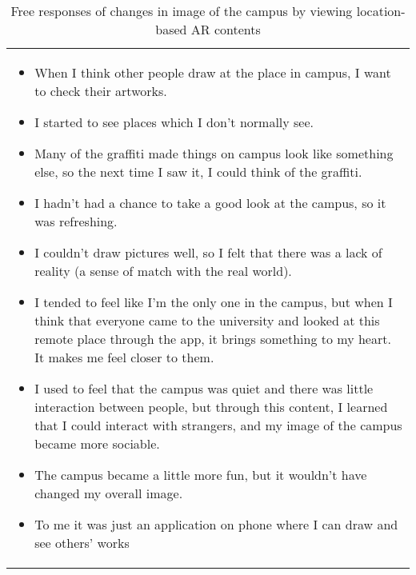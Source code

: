 \begin{table}[h]
\begin{center}
    \caption{Free responses of changes in image of the campus by viewing location-based AR contents}\label{table:11}
    \begin{tabular}{L{\textwidth}}
        \hline
           \\
        \hline
          {
            \begin{itemize}
              \item When I think other people draw at the place in campus, I want to check their artworks.
              \item I started to see places which I don't normally see.
              \item Many of the graffiti made things on campus look like something else, so the next time I saw it, I could think of the graffiti.
              \item I hadn't had a chance to take a good look at the campus, so it was refreshing.
              \item I couldn't draw pictures well, so I felt that there was a lack of reality (a sense of match with the real world).
              \item I tended to feel like I'm the only one in the campus, but when I think that everyone came to the university and looked at this remote place through the app, it brings something to my heart. It makes me feel closer to them.
              \item I used to feel that the campus was quiet and there was little interaction between people, but through this content, I learned that I could interact with strangers, and my image of the campus became more sociable.
              \item The campus became a little more fun, but it wouldn't have changed my overall image.
              \item To me it was just an application on phone where I can draw and see others' works
            \end{itemize}
          } \\
        \hline
    \end{tabular}
\end{center} 
\end{table}

